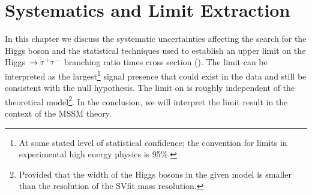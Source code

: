 \ifx\master\undefined\fi
%
\chapter{Systematics and Limit Extraction} \label{ch:systematics} 
%
In this chapter we discuss the systematic uncertainties affecting the search for
the Higgs boson and the statistical techniques used to establish an upper limit
on the Higgs~$\to\tau^+\tau^-$ branching ratio times cross section (\xbr).  The limit can
be interpreted as the largest\footnote{At some stated level of statistical
confidence; the convention for limits in experimental high energy physics
is 95\%.} signal presence that could exist in the data and still be consistent
with the null hypothesis.  The limit on \xbr is roughly independent of the
theoretical model\footnote{Provided that the width of the Higgs bosons in the
given model is smaller than the resolution of the SVfit mass resolution.}.  In
the conclusion, we will interpret the \xbr limit result in the context of the
MSSM theory.


